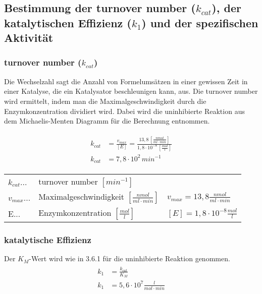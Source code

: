 \subsection{Bestimmung der turnover number ($k_{cat}$), der katalytischen Effizienz ($k_1$) und der spezifischen Aktivität}

\subsubsection{turnover number ($k_{cat}$)}
Die Wechselzahl sagt die Anzahl von Formelumsätzen in einer gewissen Zeit in einer Katalyse, die ein Katalysator beschleunigen kann, aus.
Die turnover number wird ermittelt, indem man die Maximalgeschwindigkeit durch die Enzymkonzentration dividiert wird. Dabei wird die uninhibierte Reaktion aus dem Michaelis-Menten Diagramm für die Berechnung entnommen. 

\begin{align}
  \begin{split}
    k_{cat} &= \frac{v_{max}}{[E]}  = \frac{13,8 \, [\frac{nmol}{ml \cdot min}]}{1,8 \cdot 10^{-8} \, [\frac{mol}{l}]}\\
    k_{cat} &= 7,8 \cdot 10^2 \, min^{-1} 
  \end{split}
\end{align}

\begin{table}[H]
  \begin{tabular}{lll}
    $k_{cat}$...& turnover number $[min^{-1}]$ & \\
    $v_{max}$... & Maximalgeschwindigkeit $[\frac{nmol}{ml \cdot min}]$ & $v_{max} = 13,8 \frac{nmol}{ml \cdot min}$\\
    E... & Enzymkonzentration $[\frac{mol}{l}]$ & $[E] = 1,8 \cdot 10^{-8} \frac{mol}{l}$ \\
  \end{tabular}
\end{table}

\subsubsection{katalytische Effizienz}

Der $K_M$-Wert wird wie in 3.6.1 für die uninhibierte Reaktion genommen.
\begin{align}
  \begin{split}
    k_1 &= \frac{k_{cat}}{K_M} \\
    k_1 &= 5,6 \cdot 10^7 \frac{l}{mol \cdot min}
  \end{split}
\end{align}

